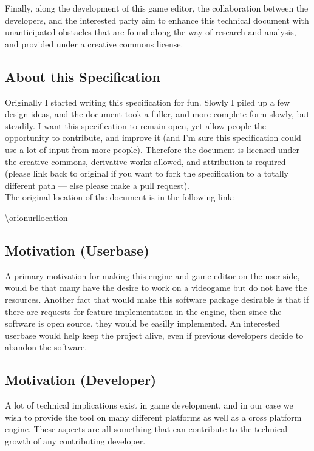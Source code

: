 Finally, along the development of this game editor, the collaboration between
the developers, and the interested party aim to enhance this technical document
with unanticipated obstacles that are found along the way of research and
analysis, and provided under a creative commons license.

\subsection{About this Specification}

Originally I started writing this specification for fun. Slowly I piled up a few
design ideas, and the document took a fuller, and more complete form slowly, but
steadily. I want this specification to remain open, yet allow people the
opportunity to contribute, and improve it (and I'm sure this specification could
use a lot of input from more people). Therefore the document is licensed under
the creative commons, derivative works allowed, and attribution is required
(please link back to original if you want to fork the specification to a totally
different path --- else please make a pull request).
\\[0.2in]
\noindent The original location of the document is in the following link:

\url{\orionurllocation}

\subsection{Motivation (Userbase)}

A primary motivation for making this engine and game editor on the user side,
would be that many have the desire to work on a videogame but do not have the
resources. Another fact that would make this software package desirable is that
if there are requests for feature implementation in the engine, then since the
software is open source, they would be easilly implemented. An interested
userbase would help keep the project alive, even if previous developers decide
to abandon the software.

\subsection{Motivation (Developer)}

A lot of technical implications exist in game development, and in our case we
wish to provide the tool on many different platforms as well as a cross platform
engine. These aspects are all something that can contribute to the technical
growth of any contributing developer.

